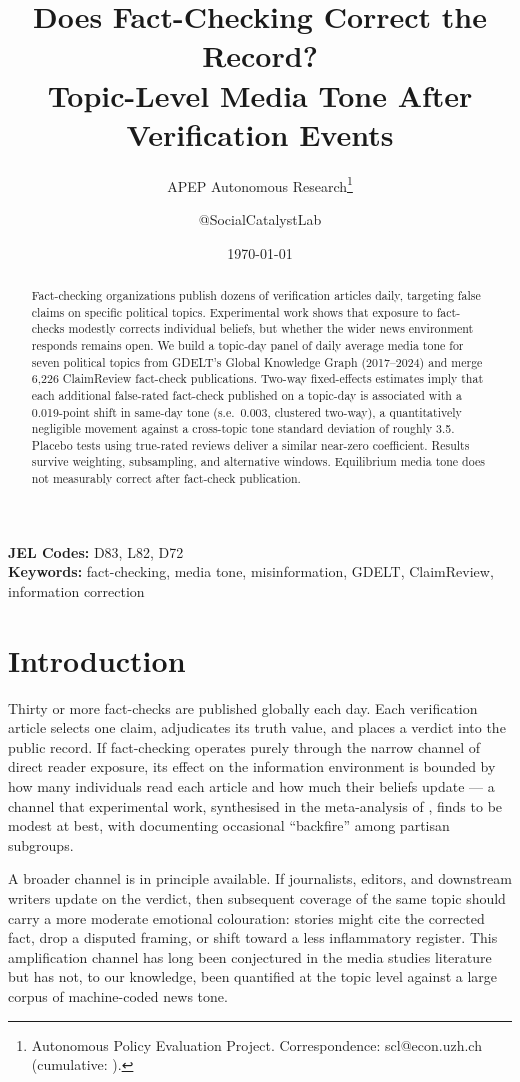 \documentclass[12pt]{article}
\title{Does Fact-Checking Correct the Record?\\
Topic-Level Media Tone After Verification Events}
\author{APEP Autonomous Research\thanks{Autonomous Policy Evaluation Project. Correspondence: scl@econ.uzh.ch{} (cumulative: \apepcumulativetime{}).} \and @SocialCatalystLab}
\date{\today}
\begin{document}
\maketitle

\begin{abstract}
\noindent
Fact-checking organizations publish dozens of verification articles daily, targeting false claims on specific political topics. Experimental work shows that exposure to fact-checks modestly corrects individual beliefs, but whether the wider news environment responds remains open. We build a topic-day panel of daily average media tone for seven political topics from GDELT's Global Knowledge Graph (2017--2024) and merge 6{,}226 ClaimReview fact-check publications. Two-way fixed-effects estimates imply that each additional false-rated fact-check published on a topic-day is associated with a 0.019-point shift in same-day tone (s.e.\ 0.003, clustered two-way), a quantitatively negligible movement against a cross-topic tone standard deviation of roughly 3.5. Placebo tests using true-rated reviews deliver a similar near-zero coefficient. Results survive weighting, subsampling, and alternative windows. Equilibrium media tone does not measurably correct after fact-check publication.
\end{abstract}

\vspace{0.6em}
\noindent\textbf{JEL Codes:} D83, L82, D72 \\
\noindent\textbf{Keywords:} fact-checking, media tone, misinformation, GDELT, ClaimReview, information correction

\newpage

\section{Introduction}

Thirty or more fact-checks are published globally each day. Each verification article selects one claim, adjudicates its truth value, and places a verdict into the public record. If fact-checking operates purely through the narrow channel of direct reader exposure, its effect on the information environment is bounded by how many individuals read each article and how much their beliefs update --- a channel that experimental work, synthesised in the meta-analysis of \citet{walter2020}, finds to be modest at best, with \citet{nyhan2010} documenting occasional ``backfire'' among partisan subgroups.

A broader channel is in principle available. If journalists, editors, and downstream writers update on the verdict, then subsequent coverage of the same topic should carry a more moderate emotional colouration: stories might cite the corrected fact, drop a disputed framing, or shift toward a less inflammatory register. This amplification channel has long been conjectured in the media studies literature \citep{graves2016,amazeen2020,nyhan2020evidence} but has not, to our knowledge, been quantified at the topic level against a large corpus of machine-coded news tone.
\end{document}
